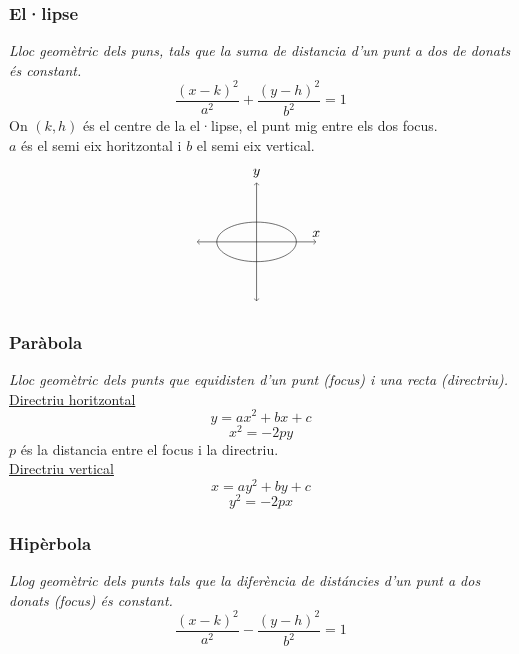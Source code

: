 \documentclass[12pt,a4paper]{article}
\begin{document}
\subsubsection{El·lipse}
\textit{Lloc geomètric dels puns, tals que la suma de distancia d'un punt a dos de donats és constant.}\\
$$\frac{\left(x-k\right)^2}{a^2}+\frac{\left(y-h\right)^2}{b^2}=1$$
On $(k, h)$ és el centre de la el·lipse, el punt mig entre els dos focus.\\
$a$ és el semi eix horitzontal i $b$ el semi eix vertical.
\begin{align*}
    \begin{tikzpicture}
        \draw[<->] (-1.5, 0) -- (1.5, 0) node[above] {$x$};
        \draw[<->] (0, -1.5) -- (0, 1.5) node[above] {$y$};
        \draw(0, 0) ellipse (1cm and 0.5cm);
    \end{tikzpicture}
\end{align*}
\newpage
\subsubsection{Paràbola}
\textit{Lloc geomètric dels punts que equidisten d'un punt (focus) i una recta (directriu).}\\
\underline{Directriu horitzontal}
$$y=ax^2+bx+c$$
$$x^2=-2py$$
$p$ és la distancia entre el focus i la directriu.\\

\underline{Directriu vertical}
$$x=ay^2+by+c$$
$$y^2=-2px$$
\subsubsection{Hipèrbola}
\textit{Llog geomètric dels punts tals que la diferència de distáncies d'un punt a dos donats (focus) és constant.}\\
$$\frac{\left(x-k\right)^2}{a^2}-\frac{\left(y-h\right)^2}{b^2}=1$$
\end{document}
